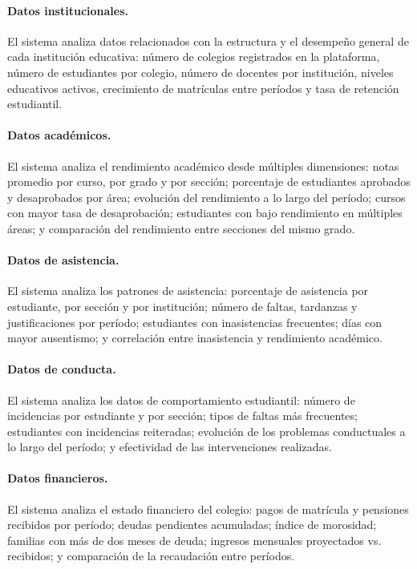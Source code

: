 \documentclass[12pt,a4paper,oneside]{report}
\begin{document}
\paragraph{Datos institucionales.} El sistema analiza datos relacionados con la estructura y el desempeño general de cada institución educativa: número de colegios registrados en la plataforma, número de estudiantes por colegio, número de docentes por institución, niveles educativos activos, crecimiento de matrículas entre períodos y tasa de retención estudiantil.

\paragraph{Datos académicos.} El sistema analiza el rendimiento académico desde múltiples dimensiones: notas promedio por curso, por grado y por sección; porcentaje de estudiantes aprobados y desaprobados por área; evolución del rendimiento a lo largo del período; cursos con mayor tasa de desaprobación; estudiantes con bajo rendimiento en múltiples áreas; y comparación del rendimiento entre secciones del mismo grado.

\paragraph{Datos de asistencia.} El sistema analiza los patrones de asistencia: porcentaje de asistencia por estudiante, por sección y por institución; número de faltas, tardanzas y justificaciones por período; estudiantes con inasistencias frecuentes; días con mayor ausentismo; y correlación entre inasistencia y rendimiento académico.

\paragraph{Datos de conducta.} El sistema analiza los datos de comportamiento estudiantil: número de incidencias por estudiante y por sección; tipos de faltas más frecuentes; estudiantes con incidencias reiteradas; evolución de los problemas conductuales a lo largo del período; y efectividad de las intervenciones realizadas.

\paragraph{Datos financieros.} El sistema analiza el estado financiero del colegio: pagos de matrícula y pensiones recibidos por período; deudas pendientes acumuladas; índice de morosidad; familias con más de dos meses de deuda; ingresos mensuales proyectados vs. recibidos; y comparación de la recaudación entre períodos.
\end{document}
